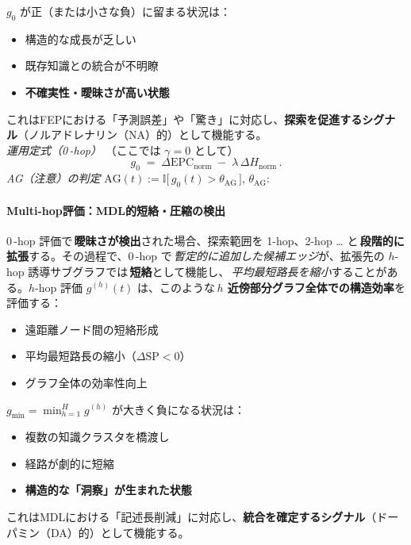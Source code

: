 \documentclass[ja=standard,xelatex]{bxjsarticle}
\begin{document}
$g_0$ が正（または小さな負）に留まる状況は：
\begin{itemize}
  \item 構造的な成長が乏しい
  \item 既存知識との統合が不明瞭
  \item \textbf{不確実性・曖昧さが高い状態}
\end{itemize}

これはFEPにおける「予測誤差」や「驚き」に対応し、\textbf{探索を促進するシグナル}（ノルアドレナリン（NA）的）として機能する。
\\[0.2em]
\textit{運用定式（0\,\mbox{-}hop）}\; （ここでは $\gamma{=}0$ として）
\begin{equation}
  g_0\;=\;\Delta\mathrm{EPC}_{\mathrm{norm}}\; -\; \lambda\,\Delta H_{\mathrm{norm}}\,.
  \label{eq:g0_runtime}
\end{equation}
\noindent \textit{AG（注意）の判定}\; \quad $\mathrm{AG}(t) := \mathbb{I}\big[\, g_0(t) > \theta_{\mathrm{AG}}\,\big]$, \;\; $\theta_{\mathrm{AG}}$:\,

\paragraph{Multi-hop評価：MDL的短絡・圧縮の検出}
0\,\mbox{-}hop 評価で\,\textbf{曖昧さが検出}された場合、探索範囲を 1-hop、2-hop … と\,\textbf{段階的に拡張}する。その過程で、0\,\mbox{-}hop で\,\emph{暫定的に追加した候補エッジ}が、拡張先の $h$-hop 誘導サブグラフでは\,\textbf{短絡}として機能し、\,\emph{平均最短路長を縮小}することがある。$h$-hop 評価 $g^{(h)}(t)$ は、このような\,\textbf{$h$ 近傍部分グラフ全体での構造効率}を評価する：
\begin{itemize}
  \item 遠距離ノード間の短絡形成
  \item 平均最短路長の縮小（$\Delta \text{SP} < 0$）
  \item グラフ全体の効率性向上
\end{itemize}


$g_{\min} = \min_{h=1}^{H} g^{(h)}$ が大きく負になる状況は：
\begin{itemize}
  \item 複数の知識クラスタを橋渡し
  \item 経路が劇的に短縮
  \item \textbf{構造的な「洞察」が生まれた状態}
\end{itemize}

これはMDLにおける「記述長削減」に対応し、\textbf{統合を確定するシグナル}（ドーパミン（DA）的）として機能する。
\\[0.2em]
\end{document}
